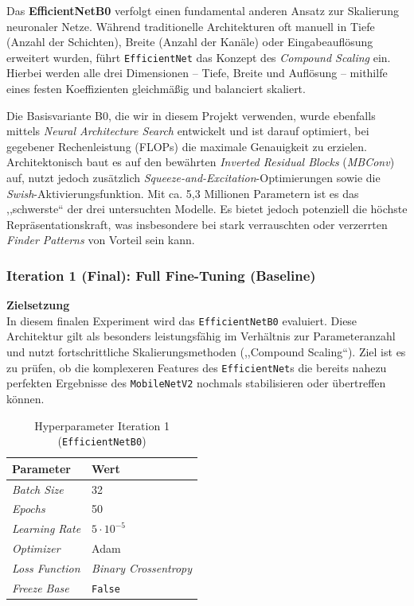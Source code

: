 \documentclass[
    a4paper,        %
    11pt,           %
    ngerman,        %
    parskip=half,   %
    listof=totoc,   %
    bibliography=totoc %
]{scrartcl}
\begin{document}
Das \textbf{EfficientNetB0} verfolgt einen fundamental anderen Ansatz zur Skalierung neuronaler Netze. Während traditionelle Architekturen oft manuell in Tiefe (Anzahl der Schichten), Breite (Anzahl der Kanäle) oder Eingabeauflösung erweitert wurden, führt \texttt{EfficientNet} das Konzept des \textit{Compound Scaling} ein. Hierbei werden alle drei Dimensionen – Tiefe, Breite und Auflösung – mithilfe eines festen Koeffizienten gleichmäßig und balanciert skaliert.

Die Basisvariante B0, die wir in diesem Projekt verwenden, wurde ebenfalls mittels \textit{Neural Architecture Search} entwickelt und ist darauf optimiert, bei gegebener Rechenleistung (FLOPs) die maximale Genauigkeit zu erzielen. Architektonisch baut es auf den bewährten \textit{Inverted Residual Blocks} (\textit{MBConv}) auf, nutzt jedoch zusätzlich \textit{Squeeze-and-Excitation}-Optimierungen sowie die \textit{Swish}-Aktivierungsfunktion. Mit ca. 5,3 Millionen Parametern ist es das ,,schwerste`` der drei untersuchten Modelle. Es bietet jedoch potenziell die höchste Repräsentationskraft, was insbesondere bei stark verrauschten oder verzerrten \textit{Finder Patterns} von Vorteil sein kann.

\subsubsection{Iteration 1 (Final): Full Fine-Tuning (Baseline)}

\textbf{Zielsetzung} \\
In diesem finalen Experiment wird das \texttt{EfficientNetB0} evaluiert. Diese Architektur gilt als besonders leistungsfähig im Verhältnis zur Parameteranzahl und nutzt fortschrittliche Skalierungsmethoden (,,Compound Scaling``). Ziel ist es zu prüfen, ob die komplexeren Features des \texttt{EfficientNet}s die bereits nahezu perfekten Ergebnisse des \texttt{MobileNetV2} nochmals stabilisieren oder übertreffen können.

\begin{table}[H]
    \centering
    \caption{Hyperparameter Iteration 1 (\texttt{EfficientNetB0})}
    \label{tab:effnetb0_hyperparams_iter1}
    \begin{tabular}{ll}
        \toprule
        \textbf{Parameter} & \textbf{Wert} \\
        \midrule
        \textit{Batch Size} & 32 \\
        \textit{Epochs} & 50 \\
        \textit{Learning Rate} & $5 \cdot 10^{-5}$ \\
        \textit{Optimizer} & Adam \\
        \textit{Loss Function} & \textit{Binary Crossentropy} \\
        \textit{Freeze Base} & \texttt{False} \\
        \bottomrule
    \end{tabular}
\end{table}
\end{document}
